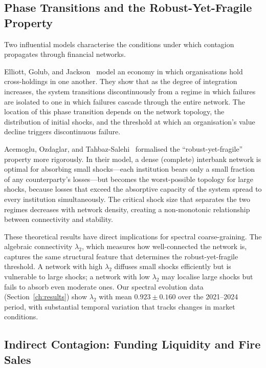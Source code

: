 \subsection{Phase Transitions and the Robust-Yet-Fragile Property}
\label{sec:phase_transitions}

Two influential models characterise the conditions under which contagion
propagates through financial networks.

Elliott, Golub, and Jackson~\cite{elliott2014financial} model an economy
in which organisations hold cross-holdings in one another.  They show
that as the degree of integration increases, the system transitions
discontinuously from a regime in which failures are isolated to one in
which failures cascade through the entire network.  The location of this
phase transition depends on the network topology, the distribution of
initial shocks, and the threshold at which an organisation's value
decline triggers discontinuous failure.

Acemoglu, Ozdaglar, and Tahbaz-Salehi~\cite{acemoglu2015systemic}
formalised the ``robust-yet-fragile'' property more rigorously.  In their
model, a dense (complete) interbank network is optimal for absorbing
small shocks---each institution bears only a small fraction of any
counterparty's losses---but becomes the worst-possible topology for
large shocks, because losses that exceed the absorptive capacity of the
system spread to every institution simultaneously.  The critical shock
size that separates the two regimes decreases with network density,
creating a non-monotonic relationship between connectivity and stability.

These theoretical results have direct implications for spectral
coarse-graining.  The algebraic connectivity $\lambda_2$, which measures
how well-connected the network is, captures the same structural feature
that determines the robust-yet-fragile threshold.  A network with high
$\lambda_2$ diffuses small shocks efficiently but is vulnerable to large
shocks; a network with low $\lambda_2$ may localise large shocks but
fails to absorb even moderate ones.  Our spectral evolution data
(Section~\ref{ch:results}) show $\lambda_2$ with mean $0.923 \pm 0.160$
over the 2021--2024 period, with substantial temporal variation that
tracks changes in market conditions.

\subsection{Indirect Contagion: Funding Liquidity and Fire Sales}
\label{sec:indirect_contagion}


